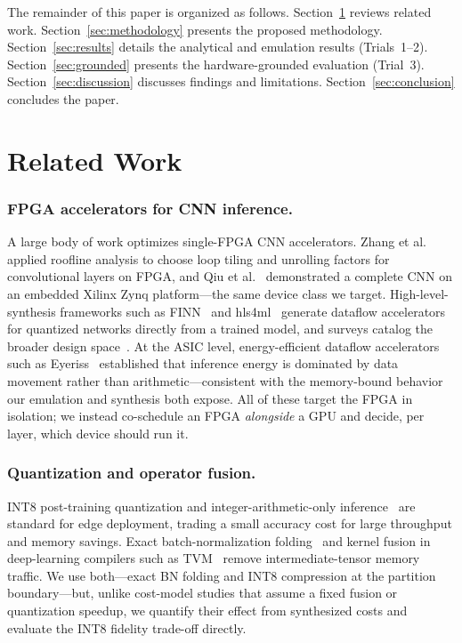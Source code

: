 \documentclass[runningheads]{llncs}
\begin{document}
The remainder of this paper is organized as follows. Section~\ref{sec:related} reviews related work. Section~\ref{sec:methodology} presents the proposed methodology. Section~\ref{sec:results} details the analytical and emulation results (Trials~1--2). Section~\ref{sec:grounded} presents the hardware-grounded evaluation (Trial~3). Section~\ref{sec:discussion} discusses findings and limitations. Section~\ref{sec:conclusion} concludes the paper.

\section{Related Work}\label{sec:related}

\subsubsection{FPGA accelerators for CNN inference.} A large body of work optimizes single-FPGA CNN accelerators. Zhang et al.~\cite{zhang2015} applied roofline analysis to choose loop tiling and unrolling factors for convolutional layers on FPGA, and Qiu et al.~\cite{qiu2016} demonstrated a complete CNN on an embedded Xilinx Zynq platform---the same device class we target. High-level-synthesis frameworks such as FINN~\cite{finn2017} and hls4ml~\cite{hls4ml2018} generate dataflow accelerators for quantized networks directly from a trained model, and surveys catalog the broader design space~\cite{guo2019}. At the ASIC level, energy-efficient dataflow accelerators such as Eyeriss~\cite{eyeriss2017} established that inference energy is dominated by data movement rather than arithmetic---consistent with the memory-bound behavior our emulation and synthesis both expose. All of these target the FPGA in isolation; we instead co-schedule an FPGA \emph{alongside} a GPU and decide, per layer, which device should run it.

\subsubsection{Quantization and operator fusion.} INT8 post-training quantization and integer-arithmetic-only inference~\cite{jacob2018,krishnamoorthi2018} are standard for edge deployment, trading a small accuracy cost for large throughput and memory savings. Exact batch-normalization folding~\cite{ioffe2015} and kernel fusion in deep-learning compilers such as TVM~\cite{tvm2018} remove intermediate-tensor memory traffic. We use both---exact BN folding and INT8 compression at the partition boundary---but, unlike cost-model studies that assume a fixed fusion or quantization speedup, we quantify their effect from synthesized costs and evaluate the INT8 fidelity trade-off directly.
\end{document}
